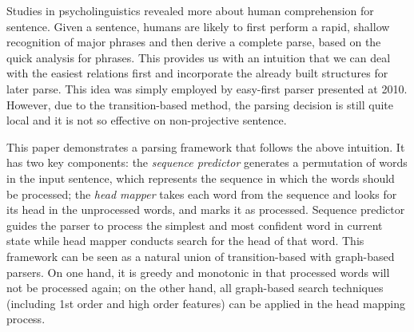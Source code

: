 



Studies in psycholinguistics revealed more about human comprehension for sentence. Given a sentence, humans are likely to first perform a rapid, shallow recognition of major phrases and then derive a complete parse, based on the quick analysis for phrases.\cite{townsend2001sentence} This provides us with an intuition that we can deal with the easiest relations first and incorporate the already built structures for later parse. 
This idea was simply employed by easy-first parser presented at 2010.\cite{goldberg2010efficient} However, due to the transition-based method, the parsing decision is still quite local and it is not so effective on non-projective sentence.
%

This paper demonstrates a parsing framework that follows the above
intuition. It has two key components: the {\em sequence predictor}
generates a permutation of words in the input sentence,
which represents the sequence in which the words should be processed;
the {\em head mapper} takes each word from the
sequence and looks for its head in the unprocessed words, and marks it as processed.
Sequence predictor guides the parser to process
the simplest and most confident word in current state while
head mapper conducts search for the head of that word.
This framework can be seen as a natural union of transition-based
with graph-based parsers. On one hand, it is greedy and monotonic in
that processed words will not be processed again; on the other hand,
all graph-based search techniques (including 1st order and high order
features) can be applied in the head mapping process.

